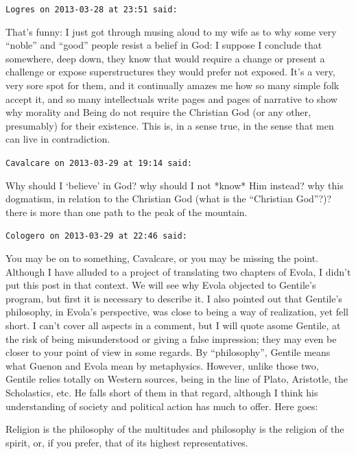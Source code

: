 \begin{footnotesize}
\begin{sffamily}
\texttt{Logres on 2013-03-28 at 23:51 said:}

That's funny: I just got through musing aloud to my wife as to why some very ``noble'' and ``good'' people resist a belief in God: I suppose I conclude that somewhere, deep down, they know that would require a change or present a challenge or expose superstructures they would prefer not exposed. It's a very, very sore spot for them, and it continually amazes me how so many simple folk accept it, and so many intellectuals write pages and pages of narrative to show why morality and Being do not require the Christian God (or any other, presumably) for their existence. This is, in a sense true, in the sense that men can live in contradiction.

\hfill

\texttt{Cavalcare on 2013-03-29 at 19:14 said:}

Why should I `believe' in God? why should I not *know* Him instead? why this dogmatism, in relation to the Christian God (what is the ``Christian God''?)? there is more than one path to the peak of the mountain.

\hfill

\texttt{Cologero on 2013-03-29 at 22:46 said:}

You may be on to something, Cavalcare, or you may be missing the point. Although I have alluded to a project of translating two chapters of Evola, I didn't put this post in that context. We will see why Evola objected to Gentile's program, but first it is necessary to describe it. I also pointed out that Gentile's philosophy, in Evola's perspective, was close to being a way of realization, yet fell short. I can't cover all aspects in a comment, but I will quote asome Gentile, at the risk of being misunderstood or giving a false impression; they may even be closer to your point of view in some regards. By ``philosophy'', Gentile means what Guenon and Evola mean by metaphysics. However, unlike those two, Gentile relies totally on Western sources, being in the line of Plato, Aristotle, the Scholastics, etc. He falls short of them in that regard, although I think his understanding of society and political action has much to offer. Here goes:

\begin{quotex}\footnotesize

Religion is the philosophy of the multitudes and philosophy is the religion of the spirit, or, if you prefer, that of its highest representatives.


\end{quotex}
\end{sffamily}
\end{footnotesize}

